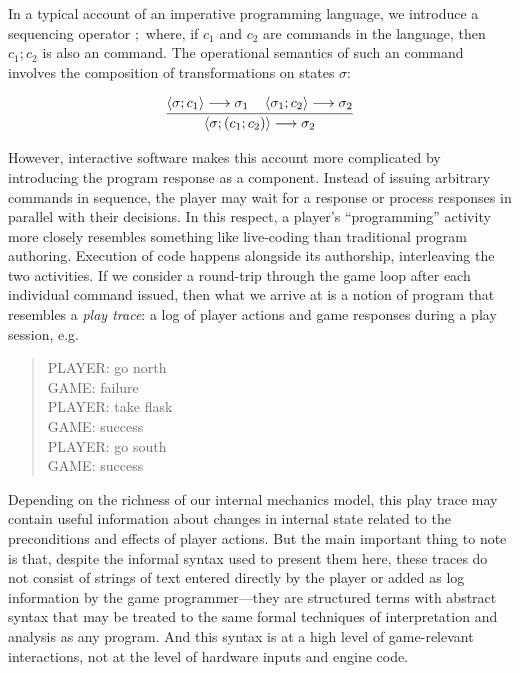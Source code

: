     In a typical account of an imperative programming language, we
    introduce a sequencing operator $;$ where, if $c_1$ and $c_2$ are
    commands in the language, then $c_1;c_2$ is also an command.
    The operational semantics of such an command involves the
    composition of transformations on states $\sigma$:

    \[
      \infer{
        \left< \sigma; (c_1;c_2)\right> \longrightarrow
        \sigma_2
      }
      {
        \left<\sigma; c_1 \right> \longrightarrow
          \sigma_1
        \quad
        \left<\sigma_1; c_2 \right> \longrightarrow
          \sigma_2
      }
    \]

    However, interactive software makes this account more complicated by
    introducing the program response as a component. Instead of issuing
    arbitrary commands in sequence, the player may wait for a response or
    process responses in parallel with their decisions. In this respect, a
    player's ``programming'' activity more closely resembles something like
    live-coding than traditional program authoring. Execution of code
    happens alongside its authorship, interleaving the two activities. If
    we consider a round-trip through the game loop after each individual
    command issued, then what we arrive at is a notion of program that
    resembles a {\em play trace}: a log of player actions and game
    responses during a play session, e.g.
    \begin{quote}
      PLAYER: go north\\
      GAME: failure\\
      PLAYER: take flask\\
      GAME: success\\
      PLAYER: go south\\
      GAME: success
    \end{quote}
    Depending on the richness of our internal mechanics model, this play
    trace may contain useful information about changes in internal state
    related to the preconditions and effects of player actions. But the
    main important thing to note is that, despite the informal syntax used
    to present them here, these traces do not consist of strings of text
    entered directly by the player or added as log information by the game
    programmer---they are structured terms with abstract syntax that may be
    treated to the same formal techniques of interpretation and analysis as
    any program. And this syntax is at a high level of game-relevant
    interactions, not at the level of hardware inputs and engine code.

